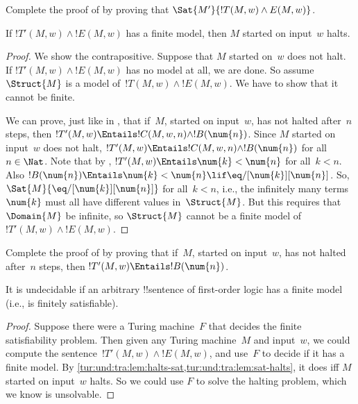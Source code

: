 \documentclass[../../../include/open-logic-section]{subfiles}
\begin{document}
\begin{prob}
  Complete the proof of  by
  proving that $\Sat{M'}{!T(M,w) \land E(M,w)}$.
\end{prob}

\begin{lem}
  If $!T'(M,w) \land !E(M,w)$ has a finite model, then $M$ started on
  input~$w$ halts.
\end{lem}

\begin{proof}
  We show the contrapositive. Suppose that $M$ started on~$w$ does not
  halt. If $!T'(M,w) \land !E(M,w)$ has no model at all, we are done.
  So assume $\Struct{M}$ is a model of~$!T(M,w) \land !E(M, w)$. We
  have to show that it cannot be finite.
  
  We can prove, just like in , that if~$M$,
  started on input~$w$, has not halted after~$n$ steps, then $!T'(M,w)
  \Entails !C(M, w, n) \land !B(\num{n})$. Since $M$ started on
  input~$w$ does not halt, $!T'(M,w) \Entails !C(M, w, n) \land
  !B(\num{n})$ for all~$n \in \Nat$. Note that by
  , $!T'(M,w) \Entails \num{k} < \num{n}$ for
  all~$k < n$. Also $!B(\num{n}) \Entails \num{k} < \num{n} \lif
  \eq/[\num{k}][\num{n}]$. So, $\Sat{M}{\eq/[\num{k}][\num{n}]}$ for
  all~$k < n$, i.e., the infinitely many terms~$\num{k}$ must all have
  different values in~$\Struct{M}$. But this requires that
  $\Domain{M}$ be infinite, so $\Struct{M}$ cannot be a finite model
  of~$!T'(M,w) \land !E(M, w)$.
\end{proof}

\begin{prob}
  Complete the proof of  by
  proving that if~$M$, started on input~$w$, has not halted after~$n$
  steps, then $!T'(M,w) \Entails !B(\num{n})$.
\end{prob}

\begin{thm}
  It is undecidable if an arbitrary !!{sentence} of first-order logic has
  a finite model (i.e., is finitely satisfiable).
\end{thm}

\begin{proof}
  Suppose there were a Turing machine~$F$ that decides the finite
  satisfiability problem. Then given any Turing machine~$M$ and
  input~$w$, we could compute the sentence~$!T'(M,w) \land !E(M,w)$,
  and use~$F$ to decide if it has a finite model. By
  \cref{tur:und:tra:lem:halts-sat,tur:und:tra:lem:sat-halts}, it does iff $M$
  started on input~$w$ halts. So we could use $F$ to solve the halting
  problem, which we know is unsolvable.
\end{proof}
\end{document}
